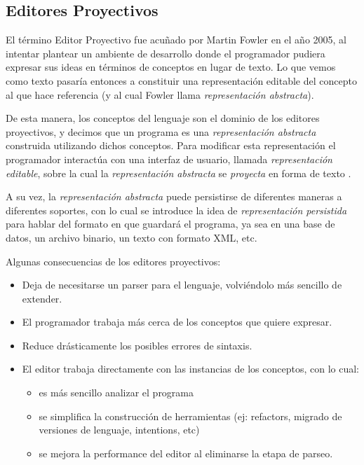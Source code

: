 
\subsection{Editores Proyectivos}

El término Editor Proyectivo fue acuñado por Martin Fowler  en el año 2005, al intentar plantear un ambiente de desarrollo donde el programador pudiera expresar sus ideas en términos de conceptos en lugar de texto. Lo que vemos como texto pasaría entonces a constituir una representación editable del concepto al que hace referencia (y al cual Fowler llama \textit{representación abstracta}).

De esta manera, los conceptos del lenguaje son el dominio de los editores proyectivos, y decimos que un programa es una \textit{representación abstracta} construida utilizando dichos conceptos. Para modificar esta representación el programador interactúa con una interfaz de usuario, llamada \textit{representación editable}, sobre la cual la \textit{representación abstracta} se \textit{proyecta} en forma de texto \cite{voelter2014projectional}. 


A su vez, la \textit{representación abstracta} puede persistirse de diferentes maneras a diferentes soportes, con lo cual se introduce la idea de \textit{representación persistida} para hablar del formato en que guardará el programa, ya sea en una base de datos, un archivo binario, un texto con formato XML, etc.


Algunas consecuencias de los editores proyectivos:
\begin{itemize}
  \item Deja de necesitarse un parser para el lenguaje, volviéndolo más sencillo de extender.
  \item El programador trabaja más cerca de los conceptos que quiere expresar.
  \item Reduce drásticamente los posibles errores de sintaxis.
  \item El editor trabaja directamente con las instancias de los conceptos, con lo cual:
  \begin{itemize}
    \item es más sencillo analizar el programa
    \item se simplifica la construcción de herramientas (ej: refactors, migrado de versiones de lenguaje, intentions, etc)
    \item se mejora la performance del editor al eliminarse la etapa de parseo.
  \end{itemize}
\end{itemize}

